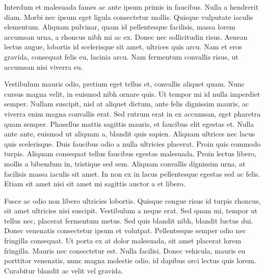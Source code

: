 \documentclass{article}
\begin{document}
Interdum et malesuada fames ac ante ipsum primis in faucibus. Nulla a hendrerit diam. Morbi nec ipsum eget ligula consectetur mollis. Quisque vulputate iaculis elementum. Aliquam pulvinar, quam id pellentesque facilisis, massa lorem accumsan urna, a rhoncus nibh mi ac ex. Donec nec sollicitudin risus. Aenean lectus augue, lobortis id scelerisque sit amet, ultrices quis arcu. Nam et eros gravida, consequat felis eu, lacinia arcu. Nam fermentum convallis risus, ut accumsan nisi viverra eu.


Vestibulum mauris odio, pretium eget tellus et, convallis aliquet quam. Nunc cursus magna velit, in euismod nibh ornare quis. Ut tempor mi id nulla imperdiet semper. Nullam suscipit, nisl at aliquet dictum, ante felis dignissim mauris, ac viverra enim magna convallis erat. Sed rutrum erat in ex accumsan, eget pharetra quam semper. Phasellus mattis sagittis mauris, et faucibus elit egestas et. Nulla ante ante, euismod ut aliquam a, blandit quis sapien. Aliquam ultrices nec lacus quis scelerisque. Duis faucibus odio a nulla ultricies placerat. Proin quis commodo turpis. Aliquam consequat tellus faucibus egestas malesuada. Proin lectus libero, mollis a bibendum in, tristique sed sem. Aliquam convallis dignissim urna, at facilisis massa iaculis sit amet. In non ex in lacus pellentesque egestas sed ac felis. Etiam sit amet nisi sit amet mi sagittis auctor a et libero.


Fusce ac odio non libero ultricies lobortis. Quisque congue risus id turpis rhoncus, sit amet ultricies nisi suscipit. Vestibulum a neque erat. Sed quam mi, tempor ut tellus nec, placerat fermentum metus. Sed quis blandit nibh, blandit luctus dui. Donec venenatis consectetur ipsum et volutpat. Pellentesque semper odio nec fringilla consequat. Ut porta ex at dolor malesuada, sit amet placerat lorem fringilla. Mauris nec consectetur est. Nulla facilisi. Donec vehicula, mauris eu porttitor venenatis, nunc magna molestie odio, id dapibus orci lectus quis lorem. Curabitur blandit ac velit vel gravida.
\end{document}
